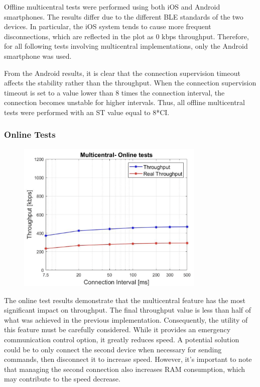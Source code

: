 \documentclass{Configuration_Files/PoliMi3i_thesis}
\begin{document}
Offline multicentral tests were performed using both iOS and Android smartphones. The results differ due to the different BLE standards of the two devices. In particular, the iOS system tends to cause more frequent disconnections, which are reflected in the plot as 0 kbps throughput. Therefore, for all following tests involving multicentral implementations, only the Android smartphone was used.

From the Android results, it is clear that the connection supervision timeout affects the stability rather than the throughput. When the connection supervision timeout is set to a value lower than 8 times the connection interval, the connection becomes unstable for higher intervals. Thus, all offline multicentral tests were performed with an ST value equal to 8*CI.

\subsubsection*{Online Tests}

\begin{figure}[h!]
    \centering
    \includegraphics[width=0.8\textwidth]{Results Manuel/figure27}
    \label{fig:figure1}
\end{figure}

The online test results demonstrate that the multicentral feature has the most significant impact on throughput. The final throughput value is less than half of what was achieved in the previous implementation. Consequently, the utility of this feature must be carefully considered. While it provides an emergency communication control option, it greatly reduces speed. A potential solution could be to only connect the second device when necessary for sending commands, then disconnect it to increase speed. However, it's important to note that managing the second connection also increases RAM consumption, which may contribute to the speed decrease.
\end{document}
